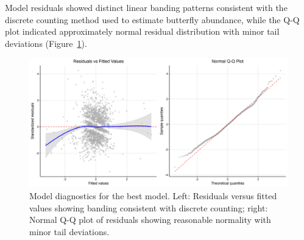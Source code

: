 Model residuals showed distinct linear banding patterns consistent with the discrete counting method used to estimate butterfly abundance, while the Q-Q plot indicated approximately normal residual distribution with minor tail deviations (Figure~\ref{fig:diagnostics}).

\begin{figure}[htbp]
\centering
\includegraphics[width=\textwidth]{figures/results/combined_diagnostics.png}
\caption{Model diagnostics for the best model. Left: Residuals versus fitted values showing banding consistent with discrete counting; right: Normal Q-Q plot of residuals showing reasonable normality with minor tail deviations.}\label{fig:diagnostics}
\end{figure}

